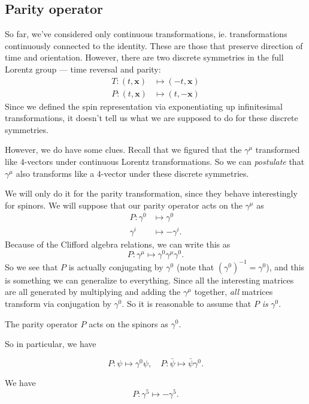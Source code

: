 \documentclass[a4paper]{article}
\begin{document}
\subsection{Parity operator}
So far, we've considered only continuous transformations, ie. transformations continuously connected to the identity. These are those that preserve direction of time and orientation. However, there are two discrete symmetries in the full Lorentz group --- time reversal and parity:
\begin{align*}
  T: (t, \mathbf{x}) &\mapsto (-t, \mathbf{x})\\
  P: (t, \mathbf{x}) &\mapsto (t, -\mathbf{x})
\end{align*}
Since we defined the spin representation via exponentiating up infinitesimal transformations, it doesn't tell us what we are supposed to do for these discrete symmetries.

However, we do have some clues. Recall that we figured that the $\gamma^\mu$ transformed like $4$-vectors under continuous Lorentz transformations. So we can \emph{postulate} that $\gamma^\mu$ also transforms like a 4-vector under these discrete symmetries.

We will only do it for the parity transformation, since they behave interestingly for spinors. We will suppose that our parity operator acts on the $\gamma^\mu$ as
\begin{align*}
  P: \gamma^0 &\mapsto \gamma^0\\
     \gamma^i &\mapsto -\gamma^i.
\end{align*}
Because of the Clifford algebra relations, we can write this as
\[
  P: \gamma^\mu \mapsto \gamma^0 \gamma^\mu \gamma^0.
\]
So we see that $P$ is actually conjugating by $\gamma^0$ (note that $(\gamma^0)^{-1} = \gamma^0$), and this is something we can generalize to everything. Since all the interesting matrices are all generated by multiplying and adding the $\gamma^\mu$ together, \emph{all} matrices transform via conjugation by $\gamma^0$. So it is reasonable to assume that $P$ \emph{is} $\gamma^0$.
\begin{axiom}
  The parity operator $P$ acts on the spinors as $\gamma^0$.
\end{axiom}

So in particular, we have
\begin{prop}
  \[
    P : \psi \mapsto \gamma^0 \psi,\quad P: \bar\psi \mapsto \bar\psi \gamma^0.
  \]
\end{prop}

\begin{prop}
  We have
  \[
    P:\gamma^5 \mapsto - \gamma^5.
  \]
\end{prop}
\end{document}
